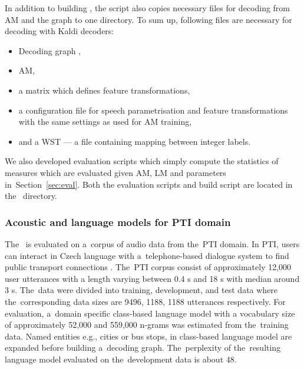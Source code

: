 In addition to building , the script also copies necessary files for decoding from \ac{AM} and the  graph to one directory.
To sum up, following files are necessary for decoding with Kaldi decoders:
\begin{itemize}
    \item Decoding graph ,
    \item \acl{AM},
    \item a matrix which defines feature transformations,
    \item a configuration file for speech parametrisation and feature transformations with the same settings as used for \ac{AM} training,
    \item and a \acf{WST} --- a file containing mapping between integer labels.
\end{itemize}

We also developed evaluation scripts which simply compute the statistics of measures which are evaluated given \ac{AM}, \ac{LM} and parameters in~Section~\ref{sec:eval}.
Both the evaluation scripts and build  script are located in the~ directory.

\subsubsection*{Acoustic and language models for \acs{PTI} domain}
\label{sec:ptilm}
The~ is evaluated on a~corpus of audio data from the~\acf{PTI} domain.
In PTI, users can interact in Czech language with a~telephone-based dialogue system to find public transport connections \cite{ptics2014url}.
The~PTI corpus consist of approximately 12,000 user utterances with a length varying between 0.4 s and 18 s with median around 3 s.
The~data were divided into training, development, and test data where the~corresponding data sizes are 9496, 1188, 1188 utterances respectively.
For evaluation, a~domain specific class-based language model with a vocabulary size of approximately 52,000  and 559,000 n-grams was estimated from the~training data.
Named entities e.g., cities or bus stops, in class-based language model are expanded before building a~decoding graph.
The~perplexity of the~resulting language model evaluated on the~development data is about 48.

